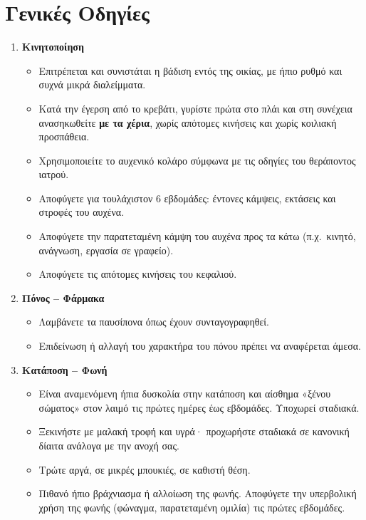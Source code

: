 \documentclass[10pt,greek]{article}
\begin{document}
\section*{Γενικές Οδηγίες}
\begin{enumerate}[label=\arabic*.]
\setlength{\parskip}{6pt}
  \item \textbf{Κινητοποίηση}
       \begin{itemize}
\item Επιτρέπεται και συνιστάται η βάδιση εντός της οικίας, με ήπιο ρυθμό και συχνά μικρά διαλείμματα.
\item Κατά την έγερση από το κρεβάτι, γυρίστε πρώτα στο πλάι και στη συνέχεια ανασηκωθείτε \textbf{με τα χέρια}, χωρίς απότομες κινήσεις και χωρίς κοιλιακή προσπάθεια.
\item Χρησιμοποιείτε το αυχενικό κολάρο σύμφωνα με τις οδηγίες του θεράποντος ιατρού.
\item Αποφύγετε για τουλάχιστον 6 εβδομάδες: έντονες κάμψεις, εκτάσεις και στροφές του αυχένα.
\item Αποφύγετε την παρατεταμένη κάμψη του αυχένα προς τα κάτω (π.χ.\ κινητό, ανάγνωση, εργασία σε γραφείο).
\item Αποφύγετε τις απότομες κινήσεις του κεφαλιού.
    \end{itemize}
  \item \textbf{Πόνος -- Φάρμακα}
      \begin{itemize}
\item Λαμβάνετε τα παυσίπονα όπως έχουν συνταγογραφηθεί.
\item Επιδείνωση ή αλλαγή του χαρακτήρα του πόνου πρέπει να αναφέρεται άμεσα.
    \end{itemize}
  \item \textbf{Κατάποση -- Φωνή}
      \begin{itemize}
\item Είναι αναμενόμενη ήπια δυσκολία στην κατάποση και αίσθημα «ξένου σώματος» στον λαιμό τις πρώτες ημέρες έως εβδομάδες. Υποχωρεί σταδιακά.
\item Ξεκινήστε με μαλακή τροφή και υγρά· προχωρήστε σταδιακά σε κανονική δίαιτα ανάλογα με την ανοχή σας.
\item Τρώτε αργά, σε μικρές μπουκιές, σε καθιστή θέση.
\item Πιθανό ήπιο βράχνιασμα ή αλλοίωση της φωνής. Αποφύγετε την υπερβολική χρήση της φωνής (φώναγμα, παρατεταμένη ομιλία) τις πρώτες εβδομάδες.

\end{itemize}
\end{enumerate}
\end{document}
